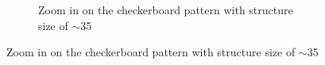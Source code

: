 \begin{figure}[ht]
\centering
    \begin{subfigure}[t]{0.3\linewidth}
	\centering
	\caption{Zoom in on the checkerboard pattern with structure size of $\sim$35}
	\label{fig:b2d5_q5}
\end{subfigure}
\hspace*{5mm}

\end{figure}
